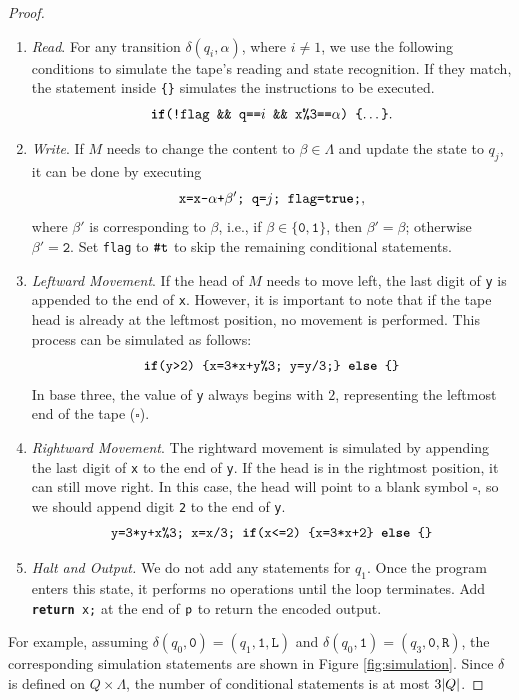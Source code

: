 \documentclass[runningheads]{llncs}
\begin{document}
\begin{proof}
\begin{enumerate}
    \item \textit{Read}. 
    For any transition $\delta(q_i, \alpha)$, where $i\ne1$, we use the following conditions to simulate the tape’s reading and state recognition.
    If they match, the statement inside \texttt{\{\}} simulates the instructions to be executed.
    $$\texttt{\textbf{if}(!flag \&\& q==$i$ \&\& x\%3==$\alpha$) \{$\dots$\}}.$$
    \item \textit{Write}. If $M$ needs to change the content to $\beta\in\Lambda$ and update the state to $q_j$, it can be done by executing
    $$\texttt{x=x-$\alpha$+$\beta'$; q=}j\texttt{; flag=\textbf{true};},$$
    where $\beta'$ is corresponding to $\beta$, i.e., if $\beta\in\{\texttt{0},\texttt{1}\}$, then $\beta'=\beta$; otherwise $\beta'=\texttt{2}$.
    Set \texttt{flag} to $\texttt{\#}\mathtt{t}$ to skip the remaining conditional statements.
    \item \textit{Leftward Movement}. If the head of $M$ needs to move left, the last digit of \texttt{y} is appended to the end of \texttt{x}.
    However, it is important to note that if the tape head is already at the leftmost position, no movement is performed. This process can be simulated as follows:
    $$\texttt{\textbf{if}(y>2) \{x=3*x+y\%3; y=y/3;\} \textbf{else} \{\}}$$
    In base three, the value of \texttt{y} always begins with $2$, representing the leftmost end of the tape (\texttt{$\square$}).
    \item \textit{Rightward Movement}. The rightward movement is simulated by appending the last digit of \texttt{x} to the end of \texttt{y}.
    If the head is in the rightmost position, it can still move right.
    In this case, the head will point to a blank symbol \texttt{$\square$}, so we should append digit \texttt{2} to the end of \texttt{y}.
    $$\texttt{y=3*y+x\%3; x=x/3; \textbf{if}(x<=2) \{x=3*x+2\} \textbf{else} \{\}}$$
    \item \textit{Halt and Output.} 
    We do not add any statements for $q_1$. 
    Once the program enters this state, it performs no operations until the loop terminates.
    Add \texttt{\textbf{return} x;} at the end of $\mathsf{p}$ to return the encoded output.
\end{enumerate}
For example, assuming $\delta(q_0,\texttt{0})=(q_1,\texttt{1},\mathtt{L})$ and $\delta(q_0,\texttt{1})=(q_3,\texttt{0},\mathtt{R})$, the corresponding simulation statements are shown in Figure \ref{fig:simulation}.
Since $\delta$ is defined on $Q\times\Lambda$, the number of conditional statements is at most $3\vert Q\vert$. 

\end{proof}
\end{document}
